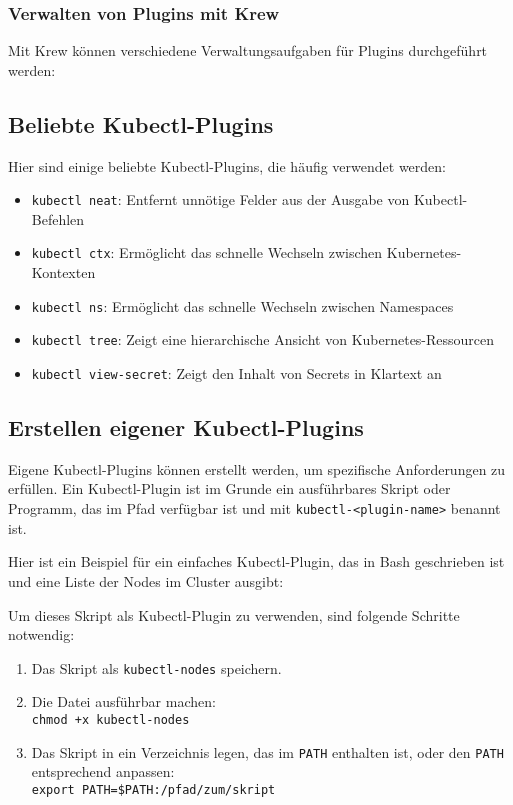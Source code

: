 \subsubsection{Verwalten von Plugins mit Krew}
Mit Krew können verschiedene Verwaltungsaufgaben für Plugins durchgeführt werden:


\subsection{Beliebte Kubectl-Plugins}
Hier sind einige beliebte Kubectl-Plugins, die häufig verwendet werden:

\begin{itemize}
    \item \texttt{kubectl neat}: Entfernt unnötige Felder aus der Ausgabe von Kubectl-Befehlen
    \item \texttt{kubectl ctx}: Ermöglicht das schnelle Wechseln zwischen Kubernetes-Kontexten
    \item \texttt{kubectl ns}: Ermöglicht das schnelle Wechseln zwischen Namespaces
    \item \texttt{kubectl tree}: Zeigt eine hierarchische Ansicht von Kubernetes-Ressourcen
    \item \texttt{kubectl view-secret}: Zeigt den Inhalt von Secrets in Klartext an
\end{itemize}

\subsection{Erstellen eigener Kubectl-Plugins}
Eigene Kubectl-Plugins können erstellt werden, um spezifische Anforderungen zu erfüllen. Ein Kubectl-Plugin ist im Grunde ein ausführbares Skript oder Programm, das im Pfad verfügbar ist und mit \texttt{kubectl-<plugin-name>} benannt ist.

Hier ist ein Beispiel für ein einfaches Kubectl-Plugin, das in Bash geschrieben ist und eine Liste der Nodes im Cluster ausgibt:


Um dieses Skript als Kubectl-Plugin zu verwenden, sind folgende Schritte notwendig:

\begin{enumerate}
    \item Das Skript als \texttt{kubectl-nodes} speichern.
    \item Die Datei ausführbar machen:\\
    \texttt{chmod +x kubectl-nodes}
    \item Das Skript in ein Verzeichnis legen, das im \texttt{PATH} enthalten ist, oder den \texttt{PATH} entsprechend anpassen:\\
    \texttt{export PATH=\$PATH:/pfad/zum/skript}
\end{enumerate}

